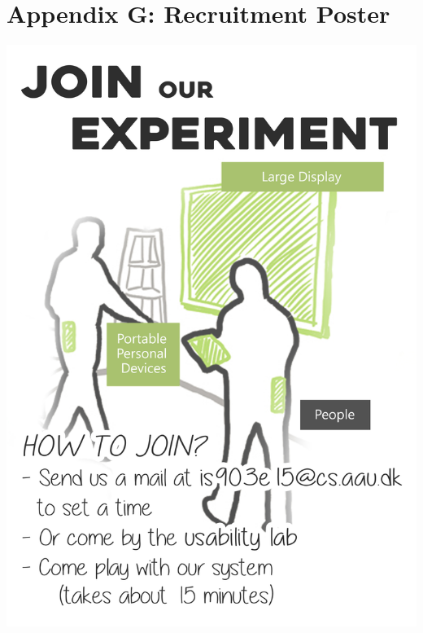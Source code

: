 \section{Appendix G: Recruitment Poster}
\begin{adjustbox}{width=\textwidth}
	\includegraphics{images/poster.jpg}
\end{adjustbox}